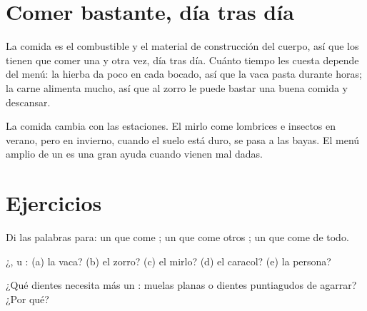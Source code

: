 \section{Comer bastante, día tras día}

\begin{proposition}\label{prop:g2:what-animals-eat:daily}
La comida es el combustible y el material de construcción del cuerpo,
así que los  tienen que comer una y otra vez, día tras día.
Cuánto tiempo les cuesta depende del menú: la hierba da poco en cada
bocado, así que la vaca pasta durante horas; la carne alimenta mucho,
así que al zorro le puede bastar una buena comida y descansar.
\end{proposition}
\admitted

\begin{example}\label{ex:g2:what-animals-eat:winter}
La comida cambia con las estaciones. El mirlo come lombrices e
insectos en verano, pero en invierno, cuando el suelo está duro, se
pasa a las bayas. El menú amplio de un  es una gran ayuda
cuando vienen mal dadas.
\end{example}

\section{Ejercicios}

\begin{exercise}[$\star$]\label{exo:g2:what-animals-eat:1}
Di las palabras para: un  que come ; un  que come
otros ; un  que come de todo.
\end{exercise}

\begin{exercise}[$\star$]\label{exo:g2:what-animals-eat:2}
¿,  u : (a) la vaca? (b) el zorro? (c) el
mirlo? (d) el caracol? (e) la persona?
\end{exercise}

\begin{exercise}[$\star$]\label{exo:g2:what-animals-eat:3}
¿Qué dientes necesita más un : muelas planas o dientes
puntiagudos de agarrar? ¿Por qué?
\end{exercise}

